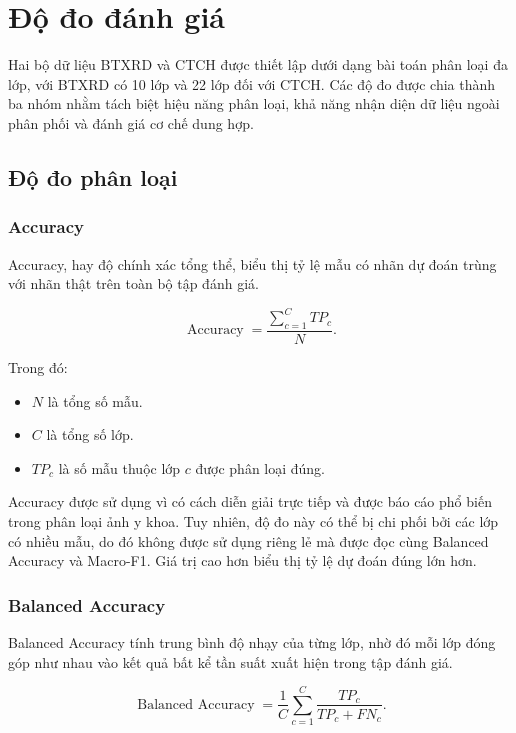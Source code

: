 \section{Độ đo đánh giá}
\label{sec:evaluation_metrics}
Hai bộ dữ liệu BTXRD \cite{Yao2025} và CTCH được thiết lập dưới dạng bài toán phân loại đa lớp, với BTXRD có 10 lớp và 22 lớp đối với CTCH. Các độ đo được chia thành ba nhóm nhằm tách biệt hiệu năng phân loại, khả năng nhận diện dữ liệu ngoài phân phối và đánh giá cơ chế dung hợp.

\subsection{Độ đo phân loại}

\subsubsection{Accuracy}

Accuracy, hay độ chính xác tổng thể, biểu thị tỷ lệ mẫu có nhãn dự đoán trùng với nhãn thật trên toàn bộ tập đánh giá.

\begin{equation}\operatorname{Accuracy}=\frac{\sum_{c=1}^{C} TP_c}{N}.\label{eq:ch4_accuracy}\end{equation}

Trong đó:
\begin{itemize}
    \item $N$ là tổng số mẫu.
    \item $C$ là tổng số lớp.
    \item $TP_c$ là số mẫu thuộc lớp $c$ được phân loại đúng.
\end{itemize}

Accuracy được sử dụng vì có cách diễn giải trực tiếp và được báo cáo phổ biến trong phân loại ảnh y khoa. Tuy nhiên, độ đo này có thể bị chi phối bởi các lớp có nhiều mẫu, do đó không được sử dụng riêng lẻ mà được đọc cùng Balanced Accuracy và Macro-F1. Giá trị cao hơn biểu thị tỷ lệ dự đoán đúng lớn hơn.

\subsubsection{Balanced Accuracy}

Balanced Accuracy \cite{Brodersen2010BalancedAcc} tính trung bình độ nhạy của từng lớp, nhờ đó mỗi lớp đóng góp như nhau vào kết quả bất kể tần suất xuất hiện trong tập đánh giá.

\begin{equation}\operatorname{Balanced\ Accuracy}=\frac{1}{C}\sum_{c=1}^{C}\frac{TP_c}{TP_c+FN_c}.\label{eq:ch4_balanced_accuracy}\end{equation}

